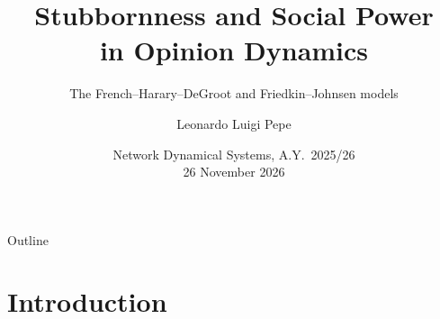 \documentclass[10pt, aspectratio=169]{beamer}
\title[Stubbornness and social power in opinion dynamics]{Stubbornness and Social Power\\ in Opinion Dynamics}
\subtitle{The French--Harary--DeGroot and Friedkin--Johnsen models}
\author[Leonardo Luigi Pepe]{Leonardo Luigi Pepe}
\date{Network Dynamical Systems, A.Y.\ 2025/26 \\ 26 November 2026}
\begin{document}
\frame{\titlepage}

\begin{frame}{Outline}
  \tableofcontents
\end{frame}

\section{Introduction}

\end{document}
